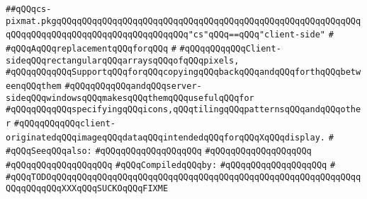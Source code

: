 \label{src/lib/x-kit/xclient/src/window/cs-pixmat.pkg}
\verb|##qQQqcs-pixmat.pkgqQQqqQQqqQQqqQQqqQQqqQQqqQQqqQQqqQQqqQQqqQQqqQQqqQQqqQQqqQQqqQQqqQQqqQQqqQQqqQQqqQQqqQQqqQQqqQQq"cs"qQQq==qQQq"client-side"|\newline
\verb|#|\newline
\verb|#qQQqAqQQqreplacementqQQqforqQQq|\newline
\verb|#|\newline
\verb|#qQQqqQQqqQQqClient-sideqQQqrectangularqQQqarraysqQQqofqQQqpixels,|\newline
\verb|#qQQqqQQqqQQqSupportqQQqforqQQqcopyingqQQqbackqQQqandqQQqforthqQQqbetweenqQQqthem|\newline
\verb|#qQQqqQQqqQQqandqQQqserver-sideqQQqwindowsqQQqmakesqQQqthemqQQqusefulqQQqfor|\newline
\verb|#qQQqqQQqqQQqspecifyingqQQqicons,qQQqtilingqQQqpatternsqQQqandqQQqother|\newline
\verb|#qQQqqQQqqQQqclient-originatedqQQqimageqQQqdataqQQqintendedqQQqforqQQqXqQQqdisplay.|\newline
\verb|#|\newline
\verb|#qQQqSeeqQQqalso:|\newline
\verb|#qQQqqQQqqQQqqQQqqQQq|\newline
\verb|#qQQqqQQqqQQqqQQqqQQq|\newline
\verb|#qQQqqQQqqQQqqQQqqQQq|\newline
\newline
\verb|#qQQqCompiledqQQqby:|\newline
\verb|#qQQqqQQqqQQqqQQqqQQq|\newline
\newline
\newline
\newline
\verb|#|\newline
\verb|#qQQqTODOqQQqqQQqqQQqqQQqqQQqqQQqqQQqqQQqqQQqqQQqqQQqqQQqqQQqqQQqqQQqqQQqqQQqqQQqXXXqQQqSUCKOqQQqFIXME|\newline
